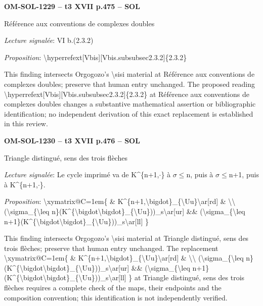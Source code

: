 \par\noindent\textbf{OM-SOL-1229 -- t3 XVII p.475 -- SOL}\par
Référence aux conventions de complexes doubles\par
\emph{Lecture signalée}: VI b.(2.3.2)\par
\emph{Proposition}: \textbackslash{}hyperrefext[Vbis][Vbis.subsubsec2.3.2]\{2.3.2\}\par
This finding intersects Orgogozo's \textbackslash{}sisi material at Référence aux conventions de complexes doubles; preserve that human entry unchanged. The proposed reading \textbackslash{}hyperrefext[Vbis][Vbis.subsubsec2.3.2]\{2.3.2\} at Référence aux conventions de complexes doubles changes a substantive mathematical assertion or bibliographic identification; no independent derivation of this exact replacement is established in this review.\par
\par\noindent\textbf{OM-SOL-1230 -- t3 XVII p.476 -- SOL}\par
Triangle distingué, sens des trois flèches\par
\emph{Lecture signalée}: Le cycle imprimé va de K\textasciicircum{}\{n+1,\ensuremath{\cdot}\} à \ensuremath{\sigma}\ensuremath{\leq}n, puis à \ensuremath{\sigma}\ensuremath{\leq}n+1, puis à K\textasciicircum{}\{n+1,\ensuremath{\cdot}\}.\par
\emph{Proposition}: \textbackslash{}xymatrix@C=\allowbreak 1em\{ \& K\textasciicircum{}\{n+1,\textbackslash{}bigdot\}\_\{\textbackslash{}Uu\}\textbackslash{}ar[rd] \& \textbackslash{}\textbackslash{} (\textbackslash{}sigma\_\{\textbackslash{}leq n\}(K\textasciicircum{}\{\textbackslash{}bigdot\textbackslash{}bigdot\}\_\{\textbackslash{}Uu\}))\_s\textbackslash{}ar[ur] \&\& (\textbackslash{}sigma\_\{\textbackslash{}leq n+1\}(K\textasciicircum{}\{\textbackslash{}bigdot\textbackslash{}bigdot\}\_\{\textbackslash{}Uu\}))\_s\textbackslash{}ar[ll] \}\par
This finding intersects Orgogozo's \textbackslash{}sisi material at Triangle distingué, sens des trois flèches; preserve that human entry unchanged. The replacement \textbackslash{}xymatrix@C=\allowbreak 1em\{ \& K\textasciicircum{}\{n+1,\textbackslash{}bigdot\}\_\{\textbackslash{}Uu\}\textbackslash{}ar[rd] \& \textbackslash{}\textbackslash{} (\textbackslash{}sigma\_\{\textbackslash{}leq n\}(K\textasciicircum{}\{\textbackslash{}bigdot\textbackslash{}bigdot\}\_\{\textbackslash{}Uu\}))\_s\textbackslash{}ar[ur] \&\& (\textbackslash{}sigma\_\{\textbackslash{}leq n+1\}(K\textasciicircum{}\{\textbackslash{}bigdot\textbackslash{}bigdot\}\_\{\textbackslash{}Uu\}))\_s\textbackslash{}ar[ll] \} at Triangle distingué, sens des trois flèches requires a complete check of the maps, their endpoints and the composition convention; this identification is not independently verified.\par
